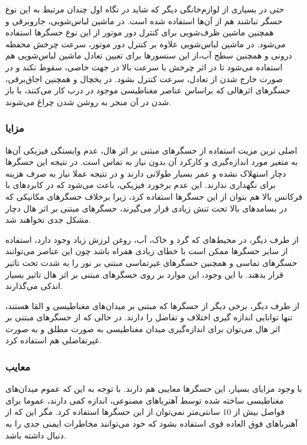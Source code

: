 \documentclass[conference]{IEEEtran-ModifiedForMVIP}
\begin{document}
حتی در بسیاری از لوازم‌خانگی دیگر که شاید در نگاه اول چندان مرتبط به این نوع حسگر نباشند هم از آن‌ها استفاده شده است. در ماشین لباس‌شویی، جاروبرقی و همچنین ماشین ظرف‌شویی برای کنترل دور موتور از این نوع حسگر‌ها استفاده می‌شود. در ماشین لباس‌شویی علاوه بر کنترل دور موتور، سرعت چرخش محفظه درونی و همچنین سطح آب،‌از این سنسور‌ها برای تعیین تعادل ماشین لباس‌شویی هم استفاده می‌شود تا در اثر چرخش با سرعت بالا در جهت خاصی، سقوط نکند و در صورت خارج شدن از تعادل، سرعت کنترل بشود. در یخچال و همچنین اجاق‌برقی، حسگر‌های اثرهالی که براساس عناصر مغناطیسی موجود در درب کار‌ می‌کنند، با باز شدن در آن منجر به روشن شدن چراغ می‌شوند.
\cite{alleg2}


 
\subsubsection{مزایا}

اصلی ترین مزیت استفاده از حسگر‌های مبتنی بر اثر هال، عدم وابستگی فیزیکی آن‌ها به متغیر مورد اندازه‌گیری و کارکرد آن بدون نیاز به تماس است. در نتیجه این حسگرها دچار استهلاک نشده و عمر بسیار طولانی دارند و در نتیجه عملا نیاز به صرف هزینه برای نگهداری ندارند. \cite{ratna} این عدم برخورد فیزیکی، باعث می‌شود که در کابردهای با فرکانس بالا هم بتوان از این حسگر‌ها استفاده کرد، زیرا برخلاف حسگر‌های مکانیکی که در بسامدهای بالا تحت تنش زیادی قرار می‌گیرند، حسگر‌های مبتنی بر اثر هال دچار مشکل جدی نخواهند شد. \cite{wiki_sensor}

از طرف دیگر، در محیط‌های که گرد و خاک، آب، روغن لرزش زیاد وجود دارد، استفاده از سایر حسگر‌ها ممکن است با خطای زیادی همراه باشد چون این عناصر می‌توانند حسگر‌های تماسی و همچنین حسگر‌های غیرتماسی مبتنی بر نور را به شدت تحت تاثیر قرار بدهند. با این وجود،‌ این موارد بر روی حسگر‌های مبتنی بر اثر هال تاثیر بسیار اندکی می‌گذارند. \cite{wiki_sensor}

از طرف دیگر،  برخی دیگر از حسگرها که مبتنی بر میدان‌های مغناطیسی و القا هستند،‌ تنها توانایی اندازه گیری اختلاف و تفاضل را دارند. در حالی که از حسگر‌های مبتنی بر اثر هال می‌توان برای اندازه‌گیری میدان مغناطیسی به صورت مطلق و به صورت غیرتفاضلی هم استفاده کرد.  \cite{wiki_sensor}
 
 \subsubsection{معایب}
 
 با وجود مزایای بسیار،‌ این حسگرها معایبی هم دارند. با توجه به این که عموم میدان‌های مغناطیسی ساخته شده توسط آهنرباهای مصنوعی،‌ اندازه کمی دارند، عموما برای فواصل بیش از $10$ سانتی‌متر نمی‌توان از این حسگرها استفاده کرد. مگر این که از آهنرباهای فوق العاده قوی استفاده بشود که خود می‌توانند مخاطرات ایمنی جدی را به دنبال داشته باشد. \cite{ratna}
 
\end{document}
